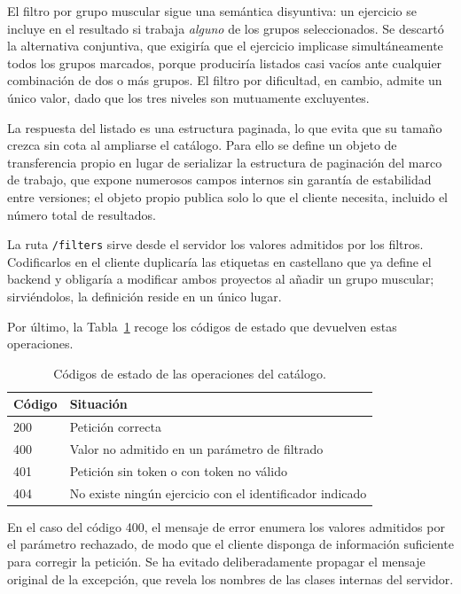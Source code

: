 \documentclass[12pt,a4paper,twoside,openright]{book}
\begin{document}
    El filtro por grupo muscular sigue una semántica disyuntiva: un ejercicio
    se incluye en el resultado si trabaja \textit{alguno} de los grupos
    seleccionados. Se descartó la alternativa conjuntiva, que exigiría que el
    ejercicio implicase simultáneamente todos los grupos marcados, porque
    produciría listados casi vacíos ante cualquier combinación de dos o más
    grupos. El filtro por dificultad, en cambio, admite un único valor, dado
    que los tres niveles son mutuamente excluyentes.

    La respuesta del listado es una estructura paginada, lo que evita que su
    tamaño crezca sin cota al ampliarse el catálogo. Para ello se define un objeto
    de transferencia propio en lugar de serializar la estructura de paginación del
    marco de trabajo, que expone numerosos campos internos sin garantía de
    estabilidad entre versiones; el objeto propio publica solo lo que el cliente
    necesita, incluido el número total de resultados.

    La ruta \texttt{/filters} sirve desde el servidor los valores admitidos por
    los filtros. Codificarlos en el cliente duplicaría las etiquetas en castellano
    que ya define el backend y obligaría a modificar ambos proyectos al añadir un
    grupo muscular; sirviéndolos, la definición reside en un único lugar.

    Por último, la Tabla~\ref{tab:api-catalogo-codigos} recoge los códigos de
    estado que devuelven estas operaciones.

    \begin{table}[htbp]
        \centering
        \begin{tabular}{l p{8cm}}
            \toprule
            \textbf{Código} & \textbf{Situación} \\
            \midrule
            200 & Petición correcta \\
            400 & Valor no admitido en un parámetro de filtrado \\
            401 & Petición sin token o con token no válido \\
            404 & No existe ningún ejercicio con el identificador indicado \\
            \bottomrule
        \end{tabular}
        \caption{Códigos de estado de las operaciones del catálogo.}
        \label{tab:api-catalogo-codigos}
    \end{table}

    En el caso del código 400, el mensaje de error enumera los valores
    admitidos por el parámetro rechazado, de modo que el cliente disponga de
    información suficiente para corregir la petición. Se ha evitado
    deliberadamente propagar el mensaje original de la excepción, que revela
    los nombres de las clases internas del servidor.
\end{document}
